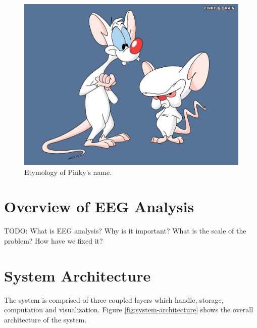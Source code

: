 \begin{figure}[h]
\begin{center}
\includegraphics[scale=0.5]{./img/pinky-and-the-brain.png}
\caption{Etymology of Pinky's name.}
\label{fig:pinky-and-the-brain}
\end{center}
\end{figure}

\section{Overview of EEG Analysis}

TODO:
What is EEG analysis? Why is it important? What is the scale of the problem? How have we fixed it?

\section{System Architecture}

The system is comprised of three coupled layers which handle, storage,
computation and visualization. Figure \ref{fig:system-architecture} shows the
overall architecture of the system.

